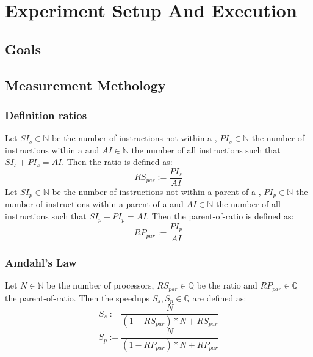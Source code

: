 \chapter{Experiment Setup And Execution}
\section{Goals}

\section{Measurement Methology}
\subsection{Definition ratios}
Let \(SI_s\in\mathbb{N}\) be the number of instructions not within a \scop, \(PI_s\in\mathbb{N}\) the number of instructions within a \scop and \(AI\in\mathbb{N}\) the number of all instructions such that \(SI_s + PI_s = AI\).
Then the \scop ratio is defined as:
\[RS_{par} := \frac{PI_s}{AI}\]
Let \(SI_p\in\mathbb{N}\) be the number of instructions not within a parent of a \scop, \(PI_p\in\mathbb{N}\) the number of instructions within a parent of a \scop and \(AI\in\mathbb{N}\) the number of all instructions such that \(SI_p + PI_p = AI\).
Then the parent-of-\scop ratio is defined as:
\[RP_{par} := \frac{PI_p}{AI}\]
\subsection[Amdahl's Law]{Amdahl's Law \cite{AmdahlsLaw}}
Let \(N\in\mathbb{N}\) be the number of processors, \(RS_{par}\in\mathbb{Q}\) be the \scops ratio and \(RP_{par}\in\mathbb{Q}\) the parent-of-\scop ratio.
Then the speedups \(S_s, S_p\in\mathbb{Q}\) are defined as:
\[S_s := \frac{N}{(1-RS_{par})*N+RS_{par}}\]
\[S_p := \frac{N}{(1-RP_{par})*N+RP_{par}}\]
